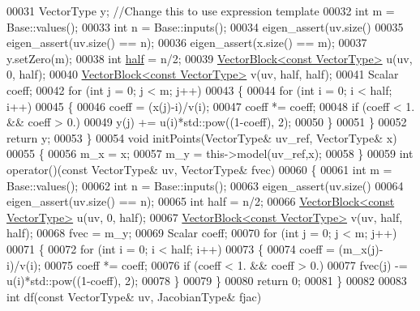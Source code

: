 \begin{DoxyCode}
00031     VectorType y; \textcolor{comment}{//Change this to use expression template}
00032     \textcolor{keywordtype}{int} m = Base::values(); 
00033     \textcolor{keywordtype}{int} n = Base::inputs();
00034     eigen\_assert(uv.size()%
00035     eigen\_assert(uv.size() == n);
00036     eigen\_assert(x.size() == m);
00037     y.setZero(m);
00038     \textcolor{keywordtype}{int} \hyperlink{struct_eigen_1_1half}{half} = n/2;
00039     \hyperlink{group___core___module_class_eigen_1_1_vector_block}{VectorBlock<const VectorType>} u(uv, 0, half);
00040     \hyperlink{group___core___module_class_eigen_1_1_vector_block}{VectorBlock<const VectorType>} v(uv, half, half);
00041     Scalar coeff;
00042     \textcolor{keywordflow}{for} (\textcolor{keywordtype}{int} j = 0; j < m; j++)
00043     \{
00044       \textcolor{keywordflow}{for} (\textcolor{keywordtype}{int} i = 0; i < half; i++) 
00045       \{
00046         coeff = (x(j)-i)/v(i);
00047         coeff *= coeff;
00048         \textcolor{keywordflow}{if} (coeff < 1. && coeff > 0.)
00049           y(j) += u(i)*std::pow((1-coeff), 2);
00050       \}
00051     \}
00052     \textcolor{keywordflow}{return} y;
00053   \}
00054   \textcolor{keywordtype}{void} initPoints(VectorType& uv\_ref, VectorType& x)
00055   \{
00056     m\_x = x;
00057     m\_y = this->model(uv\_ref,x);
00058   \}
00059   \textcolor{keywordtype}{int} operator()(\textcolor{keyword}{const} VectorType& uv, VectorType& fvec)
00060   \{
00061     \textcolor{keywordtype}{int} m = Base::values(); 
00062     \textcolor{keywordtype}{int} n = Base::inputs();
00063     eigen\_assert(uv.size()%
00064     eigen\_assert(uv.size() == n);
00065     \textcolor{keywordtype}{int} half = n/2;
00066     \hyperlink{group___core___module_class_eigen_1_1_vector_block}{VectorBlock<const VectorType>} u(uv, 0, half);
00067     \hyperlink{group___core___module_class_eigen_1_1_vector_block}{VectorBlock<const VectorType>} v(uv, half, half);
00068     fvec = m\_y;
00069     Scalar coeff;
00070     \textcolor{keywordflow}{for} (\textcolor{keywordtype}{int} j = 0; j < m; j++)
00071     \{
00072       \textcolor{keywordflow}{for} (\textcolor{keywordtype}{int} i = 0; i < half; i++)
00073       \{
00074         coeff = (m\_x(j)-i)/v(i);
00075         coeff *= coeff;
00076         \textcolor{keywordflow}{if} (coeff < 1. && coeff > 0.)
00077           fvec(j) -= u(i)*std::pow((1-coeff), 2);
00078       \}
00079     \}
00080     \textcolor{keywordflow}{return} 0;
00081   \}
00082   
00083   \textcolor{keywordtype}{int} df(\textcolor{keyword}{const} VectorType& uv, JacobianType& fjac)

\end{DoxyCode}
